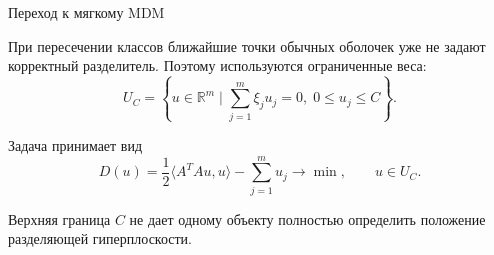\SPBGContentSlide
  {Переход к мягкому MDM}
  {%
    \FormulaBody
    При пересечении классов ближайшие точки обычных оболочек уже не задают
    корректный разделитель. Поэтому используются ограниченные веса:
    \[
      U_C=\left\{
        u\in\mathbb{R}^m\mid
        \sum_{j=1}^{m}\xi_j u_j=0,\;
        0\le u_j\le C
      \right\}.
    \]

    Задача принимает вид
    \[
      D(u)=
      \frac12\langle A^TAu,u\rangle-
      \sum_{j=1}^{m}u_j
      \to\min,\qquad u\in U_C.
    \]

    \Body
    Верхняя граница \(C\) не дает одному объекту полностью определить
    положение разделяющей гиперплоскости.
  }


